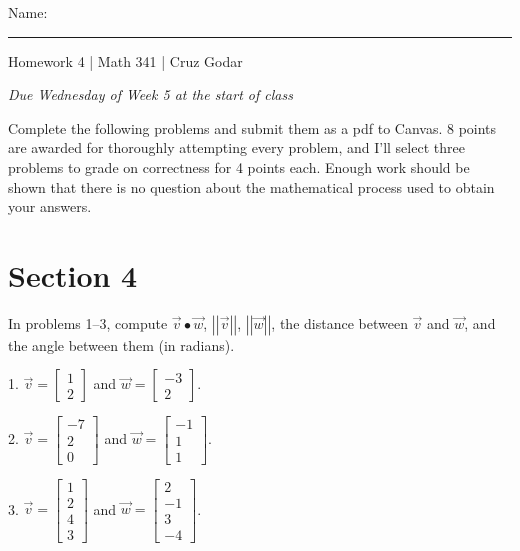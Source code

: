 \documentclass{article}
\begin{document}
\Large Name: \rule{2in}{0.15mm} \hfill Homework 4 | Math 341 | Cruz Godar \vspace{4pt} \normalsize

\textit{Due Wednesday of Week 5 at the start of class}

Complete the following problems and submit them as a pdf to Canvas. 8 points are awarded for thoroughly attempting every problem, and I'll select three problems to grade on correctness for 4 points each. Enough work should be shown that there is no question about the mathematical process used to obtain your answers.

\section{Section 4}

In problems 1--3, compute $\vec{v} \bullet \vec{w}$, $\left| \left| \vec{v} \right| \right|$, $\left| \left| \vec{w} \right| \right|$, the distance between $\vec{v}$ and $\vec{w}$, and the angle between them (in radians).

1. $\vec{v} = \left[\begin{array}{c} 1 \\ 2 \end{array}\right]$ and $\vec{w} = \left[\begin{array}{c} -3 \\ 2 \end{array}\right]$.

2. $\vec{v} = \left[\begin{array}{c} -7 \\ 2 \\ 0 \end{array}\right]$ and $\vec{w} = \left[\begin{array}{c} -1 \\ 1 \\ 1 \end{array}\right]$.

3. $\vec{v} = \left[\begin{array}{c} 1 \\ 2 \\ 4 \\ 3 \end{array}\right]$ and $\vec{w} = \left[\begin{array}{c} 2 \\ -1 \\ 3 \\ -4 \end{array}\right]$.
\end{document}
